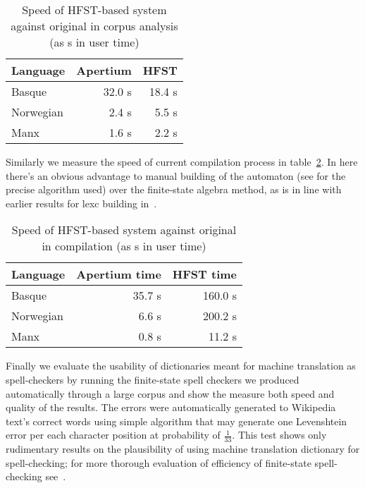 \documentclass[10pt,a4paper]{article}
\begin{document}
\begin{table}[h]
\begin{center}
\begin{tabular}{|l|r|r|}
\hline
\bf Language & \bf Apertium & \bf HFST \\
\hline
Basque       & 32.0 s& 18.4 s \\
Norwegian    & 2.4 s & 5.5  s \\
Manx         & 1.6 s & 2.2  s \\
\hline
\end{tabular}
\caption{Speed of HFST-based system against original in corpus analysis
 (as s in user time)
\label{table:speed}}
\end{center}
\end{table}

Similarly we measure the speed of current compilation process in 
table~\ref{table:compile-speed}. In here there's an obvious advantage to
manual building of the automaton (see \cite{rojas2005} for the precise algorithm
used) over the finite-state algebra method, as is
in line with earlier results for lexc building in~\cite{pirinen/2009/sfcm}.

\begin{table}[h]
\begin{center}
\begin{tabular}{|l|r|r|}
\hline
\bf Language & \bf Apertium time & \bf HFST time \\
\hline
Basque       & 35.7 s & 160.0  s \\
Norwegian    & 6.6 s  & 200.2 s \\
Manx         & 0.8 s  & 11.2  s \\
\hline
\end{tabular}
\caption{Speed of HFST-based system against original in compilation
 (as s in user time)
\label{table:compile-speed}}
\end{center}
\end{table}

Finally we evaluate the usability of dictionaries meant for machine translation
as spell-checkers by running the finite-state spell checkers we produced
automatically through a large corpus and show the measure both speed and
quality of the results. The errors were automatically generated to Wikipedia
text's correct words using simple algorithm that may generate one Levenshtein
error per each character position at probability of $\frac{1}{33}$.  This test
shows only rudimentary results on the plausibility of using machine translation
dictionary for spell-checking; for more thorough evaluation of efficiency of
finite-state spell-checking see~\cite{hassan/2008}.
\end{document}
